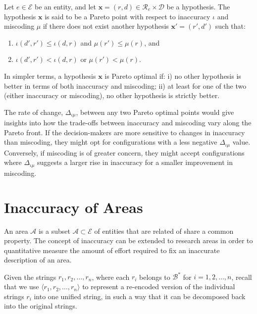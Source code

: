 \begin{definition}
Let \( e \in \mathcal{E} \) be an entity, and let \( \mathbf{x} = (r, d) \in \mathcal{R}_e \times \mathcal{D} \) be a hypothesis. The hypothesis \( \mathbf{x} \) is said to be a Pareto point with respect to inaccuracy \( \iota \) and miscoding \( \mu \) if there does not exist another hypothesis \( \mathbf{x'} = (r', d') \) such that:
\begin{enumerate}
    \item \( \iota(d', r') \leq \iota(d, r) \) and \( \mu(r') \leq \mu(r) \), and
    \item \( \iota(d', r') < \iota(d, r) \) or \( \mu(r') < \mu(r) \).
\end{enumerate}
\end{definition}

In simpler terms, a hypothesis \( \mathbf{x} \) is Pareto optimal if: i) no other hypothesis is better in terms of both inaccuracy and miscoding; ii) at least for one of the two (either inaccuracy or miscoding), no other hypothesis is strictly better.

The rate of change, \( \Delta_{\iota \mu} \), between any two Pareto optimal points would give insights into how the trade-offs between inaccuracy and miscoding vary along the Pareto front. If the decision-makers are more sensitive to changes in inaccuracy than miscoding, they might opt for configurations with a less negative \( \Delta_{\iota \mu} \) value. Conversely, if miscoding is of greater concern, they might accept configurations where \( \Delta_{\iota \mu} \) suggests a larger rise in inaccuracy for a smaller improvement in miscoding.

%
%

\section{Inaccuracy of Areas}

An area $\mathcal{A}$ is a subset $\mathcal{A} \subset \mathcal{E}$ of entities that are related of share a common property. The concept of inaccuracy can be extended to research areas in order to quantitative measure the amount of effort required to fix an inaccurate description of an area.

Given the strings \( r_1, r_2, \ldots, r_n \), where each \( r_i \) belongs to \( \mathcal{B}^\ast \) for \( i = 1, 2, \ldots, n \), recall that we use \( \langle r_1, r_2, \ldots, r_n \rangle \) to represent a re-encoded version of the individual strings \( r_i \) into one unified string, in such a way that it can be decomposed back into the original strings.

